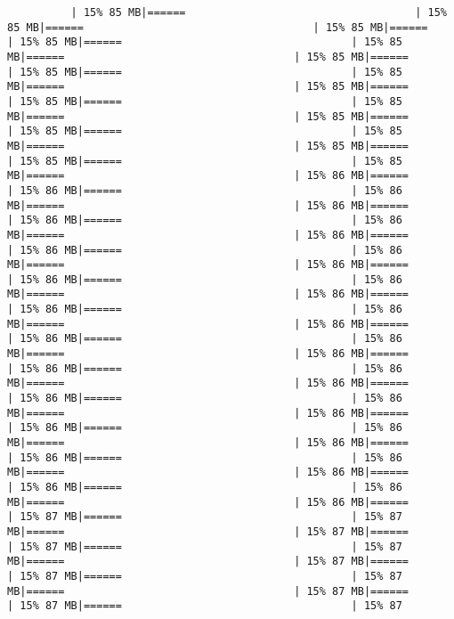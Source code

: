 \documentclass[
]{article}
\begin{document}
\begin{verbatim}
          | 15% 85 MB|======                                    | 15% 85 MB|======                                    | 15% 85 MB|======                                    | 15% 85 MB|======                                    | 15% 85 MB|======                                    | 15% 85 MB|======                                    | 15% 85 MB|======                                    | 15% 85 MB|======                                    | 15% 85 MB|======                                    | 15% 85 MB|======                                    | 15% 85 MB|======                                    | 15% 85 MB|======                                    | 15% 85 MB|======                                    | 15% 85 MB|======                                    | 15% 85 MB|======                                    | 15% 85 MB|======                                    | 15% 85 MB|======                                    | 15% 86 MB|======                                    | 15% 86 MB|======                                    | 15% 86 MB|======                                    | 15% 86 MB|======                                    | 15% 86 MB|======                                    | 15% 86 MB|======                                    | 15% 86 MB|======                                    | 15% 86 MB|======                                    | 15% 86 MB|======                                    | 15% 86 MB|======                                    | 15% 86 MB|======                                    | 15% 86 MB|======                                    | 15% 86 MB|======                                    | 15% 86 MB|======                                    | 15% 86 MB|======                                    | 15% 86 MB|======                                    | 15% 86 MB|======                                    | 15% 86 MB|======                                    | 15% 86 MB|======                                    | 15% 86 MB|======                                    | 15% 86 MB|======                                    | 15% 86 MB|======                                    | 15% 86 MB|======                                    | 15% 86 MB|======                                    | 15% 86 MB|======                                    | 15% 86 MB|======                                    | 15% 86 MB|======                                    | 15% 86 MB|======                                    | 15% 86 MB|======                                    | 15% 86 MB|======                                    | 15% 86 MB|======                                    | 15% 86 MB|======                                    | 15% 86 MB|======                                    | 15% 86 MB|======                                    | 15% 87 MB|======                                    | 15% 87 MB|======                                    | 15% 87 MB|======                                    | 15% 87 MB|======                                    | 15% 87 MB|======                                    | 15% 87 MB|======                                    | 15% 87 MB|======                                    | 15% 87 MB|======                                    | 15% 87 MB|======                                    | 15% 87 MB|======                                    | 15% 87 
\end{verbatim}
\end{document}
